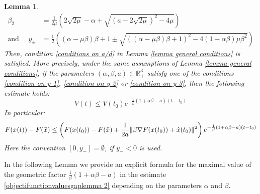 \documentclass[reqno]{amsart}
\theoremstyle{plain}
\newtheorem{lemma}{Lemma}	%
\theoremstyle{definition}
\theoremstyle{remark}
\newcommand{\R}{\mathbb{R}}	%
\DeclarePairedDelimiter{\norm}{\lVert}{\rVert}	%
\begin{document}
\begin{lemma}
\begin{align}
\beta_{2} &= \frac{1}{2\mu}\left(2\sqrt{2\mu}-\alpha + \sqrt{(a-2\sqrt{2\mu})^{2}-4\mu}\right) \label{definition beta2} \\
\text{and } \quad y_{\pm}& =\frac{1}{2}\left((\alpha-\mu\beta)\beta+1 \pm \sqrt{\left((\alpha-\mu\beta)\beta+1\right)^2 - 4(1-\alpha\beta)\mu\beta^2}\right) \label{definition ypm}
\end{align}
Then, condition \eqref{conditions on a/d} in Lemma \ref{lemma general conditions} is satisfied. More precisely, under the same assumptions of Lemma \ref{lemma general conditions}, if the parameters $(\alpha,\beta,a)\in \R_{+}^{3}$ satisfy one of the conditions \eqref{condition on y 1}, \eqref{condition on y 2} or \eqref{condition on y 3}, then the following estimate holds:
\begin{equation}\label{rate V lemma 2}
	V(t) \leq V(t_{0})e^{-\frac{1}{\beta}\left(1+\alpha\beta-a\right)(t-t_{0})}
\end{equation}
In particular:
\begin{equation}\label{objectifunctionvaluesgaplemma 2}
	F(x(t))- F(\bar{x}) \leq \left(F(x(t_{0})) - F(\bar{x}) + \frac{1}{2a}\norm{\beta\nabla F(x(t_{0}))+\dot{x}(t_{0})}^2\right)e^{-\frac{1}{\beta}\left(1+\alpha\beta-a\right)(t-t_{0})}
\end{equation}
Here the convention $[0,y_{-}]=\emptyset$, if $y_{-}<0$ is used.
\end{lemma}





In the following Lemma we provide an explicit formula for the maximal value of the geometric factor $\frac{1}{\beta}\left(1+\alpha\beta-a\right)$ in the estimate \eqref{objectifunctionvaluesgaplemma 2} depending on the parameters $\alpha$ and $\beta$. 
\end{document}
